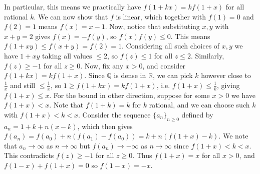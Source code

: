 \documentclass[11pt,a4paper]{article}
\begin{document}
\begin{enumerate}
	In particular, this means we practically have $f(1 + kx) = kf(1 + x)$ for all rational $k$. 
	We can now show that $f$ is linear, which together with $f(1)=0$ and $f(2)=1$ means $f(x)=x-1$. 
	Now, notice that substituting $x, y$ with $x+y=2$ gives $f(x)=-f(y)$, 
	so $f(x)f(y)\le 0$. 
	This means $f(1+xy)\le f(x+y)=f(2)=1$. 
	Considering all such choices of $x, y$ we have $1+xy$ taking all values $\le 2$, 
	so $f(z)\le 1$ for all $z\le 2$. 
	Similarly, $f(z)\ge -1$ for all $z\ge 0$. 
	Now, fix any $x > 0$, and consider $f(1 + kx) = kf(1 + x)$. 
	Since $\mathbb{Q}$ is dense in $\mathbb{R}$, 
	we can pick $k$ however close to $\frac{1}{x}$ and still $\le \frac{1}{x}$, 
	so $1\ge f(1 + kx) = kf(1 + x)$, i.e. $f(1+x)\le \frac{1}{k}$, giving $f(1+x)\le x$. 
	For the bound in other direction, suppose for some $x > 0$ we have $f(1 + x) < x$. 
	Note that $f(1+k)=k$ for $k$ rational, and we can choose such $k$ with $f(1+x) < k<x$. 
	Consider the sequence $\{a_n\}_{n\ge 0}$ defined by $a_n = 1 + k + n(x - k)$, 
	which then gives $f(a_n) = f(a_0) + n(f(a_1) - f(a_0)) = k + n(f(1+x) - k)$. 
	We note that $a_n\to\infty$ as $n\to\infty$ but $f(a_n)\to -\infty$ as $n\to\infty$ since $f(1 + x) < k < x$. 
	This contradicts $f(z)\ge -1$ for all $z\ge 0$. 
	Thus $f(1+x)=x$ for all $x > 0$, and $f(1-x)+f(1+x)=0$ so $f(1-x)=-x$. 
	\end{enumerate}
	
\end{document}
